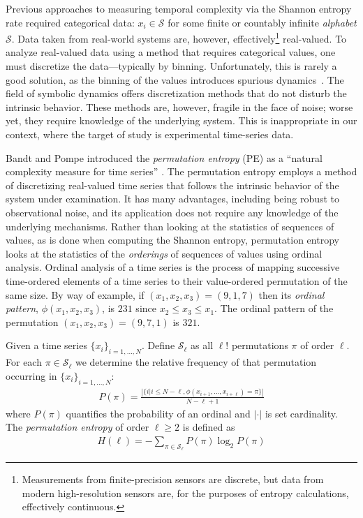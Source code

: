 Previous approaches to measuring temporal complexity via the Shannon
entropy rate \cite{Shannon1951, mantegna1994linguistic} required
categorical data: $x_i \in \mathcal{S}$ for some finite or countably
infinite \emph{alphabet} $\mathcal{S}$.  Data taken from real-world
systems are, however, effectively\footnote{Measurements from
  finite-precision sensors are discrete, but data from modern
  high-resolution sensors are, for the purposes of entropy
  calculations, effectively continuous.}  real-valued.  To analyze
real-valued data using a method that requires categorical values, one
must discretize the data---typically by binning.  Unfortunately, this
is rarely a good solution, as the binning of the values introduces
spurious dynamics~\cite{bollt2001}.  The field of symbolic dynamics
offers discretization methods that do not disturb the intrinsic
behavior.  These methods are, however, fragile in the face of noise;
worse yet, they require knowledge of the underlying system.  This is
inappropriate in our context, where the target of study is
experimental time-series data.

Bandt and Pompe introduced the \emph{permutation entropy} (PE) as a
``natural complexity measure for time series''
\cite{bandt2002per}. The permutation entropy employs a method of
discretizing real-valued time series that follows the intrinsic
behavior of the system under examination.  It has many advantages,
including being robust to observational noise, and its application
does not require any knowledge of the underlying mechanisms.  Rather
than looking at the statistics of sequences of values, as is done when
computing the Shannon entropy, permutation entropy looks at the
statistics of the \emph{orderings} of sequences of values using
ordinal analysis. Ordinal analysis of a time series is the process of
mapping successive time-ordered elements of a time series to their
value-ordered permutation of the same size.  By way of example, if
$(x_1, x_2, x_3) = (9, 1, 7)$ then its \emph{ordinal pattern},
$\phi(x_1, x_2, x_3)$, is $231$ since $x_2 \leq x_3 \leq x_1$.  The
ordinal pattern of the permutation $(x_1, x_2, x_3) = (9, 7, 1)$ is
$321$.

\begin{mydef}

  Given a time series $\{x_i\}_{i = 1,\dots,N}$. Define $\mathcal{S}_\ell$ as all $\ell!$ permutations $\pi$ of order $\ell$. For each $\pi \in \mathcal{S}_\ell$ we determine the relative frequency of that permutation occurring in $\{x_i\}_{i = 1,\dots,N}$:
  \begin{align*}
    P(\pi) = \frac{\left|\{i|i \leq N-\ell,\phi(x_{i+1},\dots,x_{i+\ell}) = \pi\}\right|}{N-\ell+1}
  \end{align*}
  where $P(\pi)$ quantifies the probability of an ordinal and
  $|\cdot|$ is set cardinality. The \emph{permutation entropy} of
  order $\ell \ge 2$ is defined as
  \begin{align*}
    H(\ell) = - \sum_{\pi \in \mathcal{S}_\ell} P(\pi) \log_2 P(\pi)
  \end{align*}

\end{mydef}

